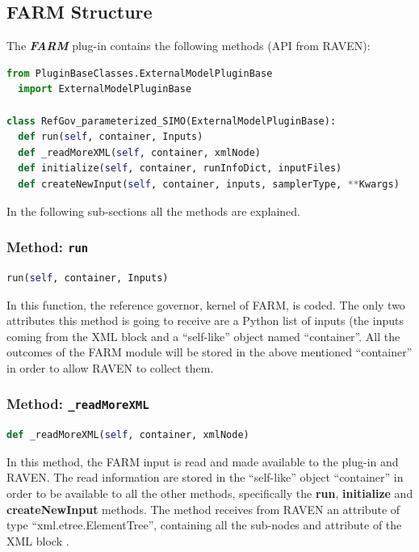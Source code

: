 \subsection{FARM Structure}
The  \textit{\textbf{FARM}} plug-in contains the following methods (API from RAVEN):

\begin{lstlisting}[language=python]
from PluginBaseClasses.ExternalModelPluginBase 
  import ExternalModelPluginBase

class RefGov_parameterized_SIMO(ExternalModelPluginBase):
  def run(self, container, Inputs)
  def _readMoreXML(self, container, xmlNode)
  def initialize(self, container, runInfoDict, inputFiles)
  def createNewInput(self, container, inputs, samplerType, **Kwargs)
\end{lstlisting}
In the following sub-sections all the methods are explained.

\subsubsection{Method: \texttt{run}}
\label{subsubsec:runExternalModelPlugin}
\begin{lstlisting}[language=python]
  run(self, container, Inputs)
\end{lstlisting}

In this function, the reference governor, kernel of FARM, is coded.
%
The only two attributes this method is going to receive are a Python list of inputs
(the inputs coming from the XML block  and a ``self-like'' object
named ``container''.
%
All the outcomes of the FARM module will be stored in the above mentioned ``container'' in order to
allow RAVEN to collect them.

\subsubsection{Method: \texttt{\_readMoreXML}}
\label{subsubsec:externalReadMoreXMLExternalModelPlugin}
\begin{lstlisting}[language=python]
  def _readMoreXML(self, container, xmlNode)
\end{lstlisting}
In this method, the FARM input is read and made available to the plug-in and RAVEN.
%
The read information are stored in the ``self-like'' object ``container''
 in order to be available to all the other methods, specifically the \textbf{run}, 
 \textbf{initialize} and \textbf{createNewInput} methods. 
%
The method receives from RAVEN an attribute of type ``xml.etree.ElementTree'',
containing all the sub-nodes and attribute of the XML block .
%

